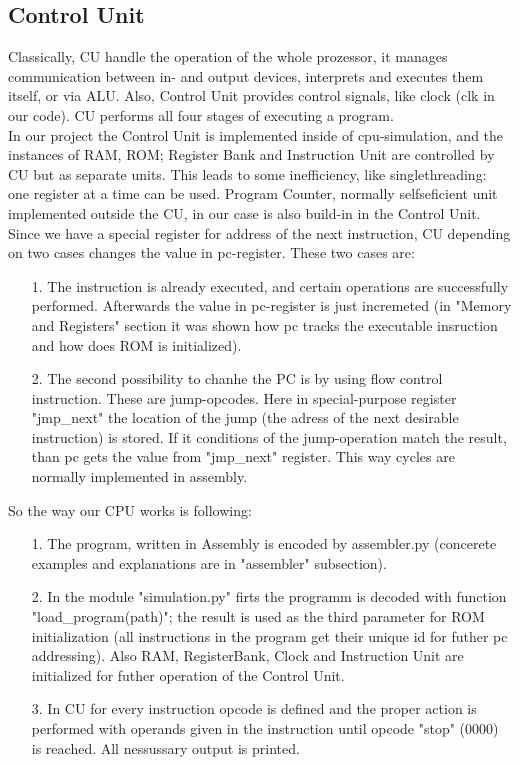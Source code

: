 \documentclass[11pt,a4paper]{article}
\begin{document}
\subsection{Control Unit}
Classically, CU handle the operation of the whole prozessor, it manages communication between in- and output devices, interprets and executes them itself, or via ALU. Also, Control Unit provides control signals, like clock (clk in our code). CU performs all four stages of executing a program.\\
In our project the Control Unit is implemented inside of cpu-simulation, and the instances of RAM, ROM; Register Bank and Instruction Unit are controlled by CU but as separate units. This leads to some inefficiency, like singlethreading: one register at a time can be used. Program Counter, normally selfseficient unit implemented outside the CU, in our case is also build-in in the Control Unit. Since we have a special register for address of the next instruction, CU depending on two cases changes the value in pc-register. These two cases are:
\begin{enumerate}
	\item[1.] The instruction is already executed, and certain operations are successfully performed. Afterwards the value in pc-register is just incremeted (in "Memory and Registers" section it was shown how pc tracks the executable insruction and how does ROM is initialized). 
	\item[2.] The second possibility to chanhe the PC is by using flow control instruction. These are jump-opcodes. Here in special-purpose register "jmp\_next" the location of the jump (the adress of the next desirable instruction) is stored. If it conditions of the jump-operation match the result, than pc gets the value from "jmp\_next" register. This way cycles are normally implemented in assembly.	
\end{enumerate} 
So the way our CPU works is following:
\begin{enumerate}
	\item[1.] The program, written in Assembly is encoded by assembler.py (concerete examples and explanations are in "assembler" subsection).
	\item[2.] In the module "simulation.py" firts the programm is decoded with function "load\_program(path)"; the result is used as the third parameter for ROM initialization (all instructions in the program get their unique id for futher pc addressing). Also RAM, RegisterBank, Clock and Instruction Unit are initialized for futher operation of the Control Unit.
	\item[3.] In CU for every instruction opcode is defined and the proper action is performed with operands given in the instruction until opcode "stop" (0000) is reached. All nessussary output is printed.  
\end{enumerate}
\end{document}
